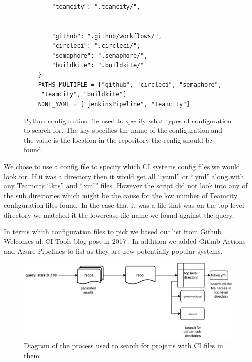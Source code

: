\documentclass[twoside,12pt,titlepage,a4paper]{article}
\begin{document}
\begin{figure}[!htbp]
\begin{minipage}{.48\textwidth}
\begin{verbatim}
        "teamcity": ".teamcity/",
    
    
        "github": ".github/workflows/",
        "circleci": ".circleci/",
        "semaphore": ".semaphore/",
        "buildkite": ".buildkite/"
    }
    PATHS_MULTIPLE = ["github", "circleci", "semaphore",
     "teamcity", "buildkite"]
    NONE_YAML = ["jenkinsPipeline", "teamcity"]
    \end{verbatim}
    \caption{Python configuration file used to specify what types of configuration to search for. The key specifies the name of the configuration and the value is the location in the repository the config should be found.}
  \end{minipage}
\end{figure}

We chose to use a config file to specify which CI systems config files we would look for. If it was a directory then it would get all \enquote{.yaml} or \enquote{.yml} along with any Teamcity \enquote{.kts} and \enquote{.xml} files. However the script did not look into any of the sub directories which might be the cause for the low number of Teamcity configuration files found. In the case that it was a file that was on the top level directory we matched it the lowercase file name we found against the query.

In terms which configuration files to pick we based our list from Github Welcomes all CI Tools blog post in 2017 \cite{Github2017}. In addition we added Github Actions and Azure Pipelines to list as they are new potentially popular systems. 

\begin{figure}[h]
  \centering
  \includegraphics[width=\textwidth]{methadology diagram.pdf}
  
  \caption[alt text]{Diagram of the process used to search for projects with CI files in them}
  \label{image_methadolgoy_diagram}
\end{figure}
\end{document}
